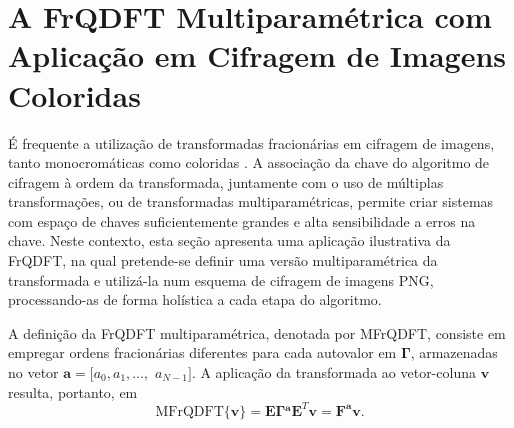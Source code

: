 \section{A FrQDFT Multiparam\'etrica com Aplica\c{c}\~ao em Cifragem de Imagens Coloridas}
\label{sec:multi}
\'E frequente a utiliza\c c\~ao de transformadas fracion\'arias em cifragem de imagens, tanto monocrom\'aticas \cite{tao2010image} como coloridas \cite{kang2018reality, kang2018color}. A associa\c c\~ao da chave do algoritmo de cifragem \`a ordem da transformada, juntamente com o uso de m\'ultiplas transforma\c c\~oes, ou de transformadas multiparam\'etricas, permite criar sistemas com espa\c co de chaves suficientemente grandes e alta sensibilidade a erros na chave. Neste contexto, esta se\c c\~ao apresenta uma aplica\c c\~ao ilustrativa da FrQDFT, na qual pretende-se definir uma vers\~ao multiparam\'etrica da transformada e utiliz\'a-la num esquema de cifragem de imagens PNG, processando-as de forma hol\'istica a cada etapa do algoritmo.

A defini\c c\~ao da FrQDFT multiparam\'etrica, denotada por MFrQDFT, consiste em empregar ordens fracion\'arias di\-fe\-ren\-tes para cada autovalor em $ \boldsymbol{\Gamma} $, armazenadas no vetor $ \mathbf{a} = [a_0, a_1, \dots, $ $ a_{N-1}] $. A aplica\c c\~ao da transformada ao vetor-coluna $ \mathbf{v} $ resulta, portanto, em
\begin{equation}
\label{eq:MFrQDFT}
\text{MFrQDFT}\{ \mathbf{v} \} = \mathbf{E} \boldsymbol{\Gamma}\mathbf{^a} \mathbf{E}^T \mathbf{v} = \mathbf{F^a} \mathbf{v}.
\end{equation}

